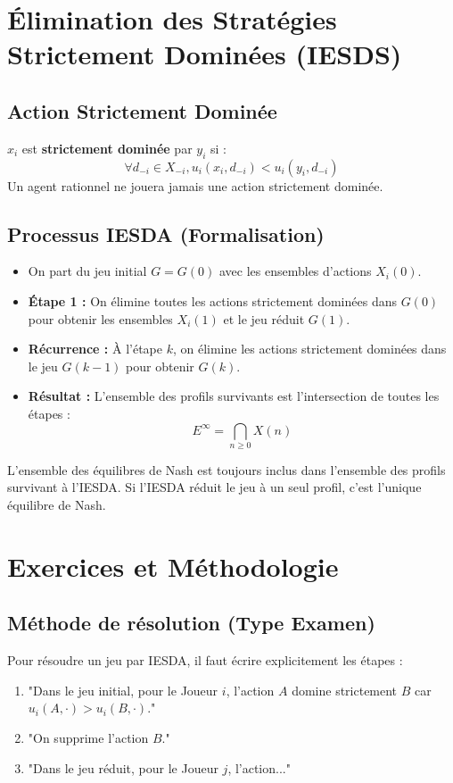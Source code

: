 \section{Élimination des Stratégies Strictement Dominées (IESDS)}

\subsection{Action Strictement Dominée}
\begin{definition}
$x_i$ est \textbf{strictement dominée} par $y_i$ si :
$$\forall d_{-i} \in X_{-i}, u_i(x_i, d_{-i}) < u_i(y_i, d_{-i})$$
Un agent rationnel ne jouera jamais une action strictement dominée.
\end{definition}

\subsection{Processus IESDA (Formalisation)}
\begin{itemize}
    \item On part du jeu initial $G = G(0)$ avec les ensembles d'actions $X_i(0)$.
    \item \textbf{Étape 1 :} On élimine toutes les actions strictement dominées dans $G(0)$ pour obtenir les ensembles $X_i(1)$ et le jeu réduit $G(1)$.
    \item \textbf{Récurrence :} À l'étape $k$, on élimine les actions strictement dominées dans le jeu $G(k-1)$ pour obtenir $G(k)$.
    \item \textbf{Résultat :} L'ensemble des profils survivants est l'intersection de toutes les étapes :
    $$E^{\infty} = \bigcap_{n \ge 0} X(n)$$
\end{itemize}

\begin{corollaire}
L'ensemble des équilibres de Nash est toujours inclus dans l'ensemble des profils survivant à l'IESDA. Si l'IESDA réduit le jeu à un seul profil, c'est l'unique équilibre de Nash.
\end{corollaire}

\section{Exercices et Méthodologie}

\subsection{Méthode de résolution (Type Examen)}
Pour résoudre un jeu par IESDA, il faut écrire explicitement les étapes :
\begin{enumerate}
    \item "Dans le jeu initial, pour le Joueur $i$, l'action $A$ domine strictement $B$ car $u_i(A, \cdot) > u_i(B, \cdot)$."
    \item "On supprime l'action $B$."
    \item "Dans le jeu réduit, pour le Joueur $j$, l'action..."
\end{enumerate}

